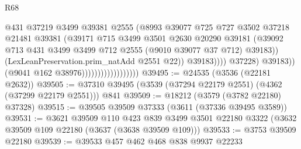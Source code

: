 \begin{lexlean}{R68}
\begin{coremodule}
                                                    @431
                                                    @37219
                                                    @3499
                                                    @39381
                                                    @2555
                                                    (@8993
                                                      @39077
                                                      @725
                                                      @727
                                                      @3502
                                                      @37218
                                                      @21481
                                                      @39381
                                                      (@39171
                                                        @715
                                                        @3499
                                                        @3501
                                                        @2630
                                                        @20290
                                                        @39181
                                                        (@39092
                                                          @713
                                                          @431
                                                          @3499
                                                          @3499
                                                          @712
                                                          @2555
                                                          (@9010 @39077 @37 @712)
                                                          @39183))
                                                      (LexLeanPreservation.prim_natAdd @2551 @22))
                                                    @39183))))
                                            @37228)
                                          @39183))
                                      (@9041 @162 @38976))))))))))))))))))
@39495 := @24535 (@3536 (@22181 @2632))
@39505 := @37310 @39495 (@3539 (@37294 @22179 @2551) (@4362 (@37299 @22179 @2551))) @841
@39509 := @18212 (@3579 (@3782 @22180) @37328)
@39515 := @39505 @39509 @37333 (@3611 (@37336 @39495 @3589))
@39531 := @3621
    @39509
    @110
    @423
    @839
    @3499
    @3501
    @22180
    @3322
    (@3632 @39509 @109 @22180 (@3637 (@3638 @39509 @109)))
@39533 := @3753 @39509 @22180
@39539 := @39533 @457 @462 @468 @838 @9937 @22233

\end{coremodule}
\end{lexlean}
